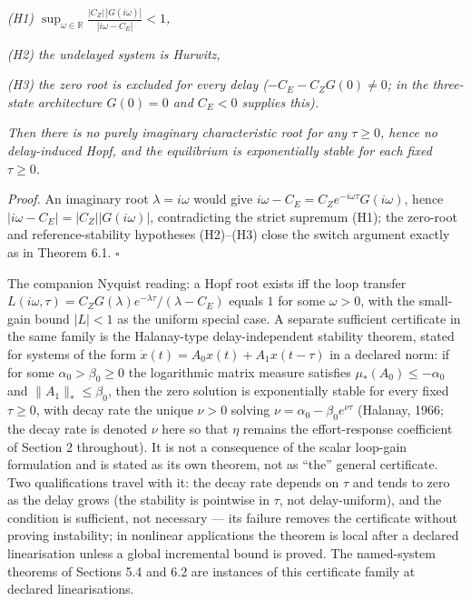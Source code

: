 \documentclass[11pt]{article}
\begin{document}
\emph{(H1)
\(\sup_{\omega \in \mathbb{R}} \frac{|C_Z|\,|G(i\omega)|}{|i\omega - C_E|} < 1\),}

\emph{(H2) the undelayed system is Hurwitz,}

\emph{(H3) the zero root is excluded for every delay
(\(-C_E - C_Z G(0) \neq 0\); in the three-state architecture
\(G(0) = 0\) and \(C_E < 0\) supplies this).}

\emph{Then there is no purely imaginary characteristic root for any
\(\tau \ge 0\), hence no delay-induced Hopf, and the equilibrium is
exponentially stable for each fixed \(\tau \ge 0\).}

\emph{Proof.} An imaginary root \(\lambda = i\omega\) would give
\(i\omega - C_E = C_Z e^{-i\omega\tau}G(i\omega)\), hence
\(|i\omega - C_E| = |C_Z||G(i\omega)|\), contradicting the strict
supremum (H1); the zero-root and reference-stability hypotheses
(H2)--(H3) close the switch argument exactly as in Theorem 6.1. \ensuremath{\square}

The companion Nyquist reading: a Hopf root exists iff the loop transfer
\(L(i\omega, \tau) = C_Z G(\lambda)e^{-\lambda\tau}/(\lambda - C_E)\)
equals \(1\) for some \(\omega > 0\), with the small-gain bound
\(|L| < 1\) as the uniform special case. A separate sufficient
certificate in the same family is the Halanay-type delay-independent
stability theorem, stated for systems of the form
\(\dot x(t) = A_0 x(t) + A_1 x(t - \tau)\) in a declared norm: if for
some \(\alpha_0 > \beta_0 \ge 0\) the logarithmic matrix measure
satisfies \(\mu_*(A_0) \le -\alpha_0\) and \(\|A_1\|_* \le \beta_0\),
then the zero solution is exponentially stable for every fixed
\(\tau \ge 0\), with decay rate the unique \(\nu > 0\) solving
\(\nu = \alpha_0 - \beta_0 e^{\nu\tau}\) (Halanay, 1966; the decay rate
is denoted \(\nu\) here so that \(\eta\) remains the effort-response
coefficient of Section 2 throughout). It is not a consequence of the
scalar loop-gain formulation and is stated as its own theorem, not as
``the'' general certificate. Two qualifications travel with it: the
decay rate depends on \(\tau\) and tends to zero as the delay grows (the
stability is pointwise in \(\tau\), not delay-uniform), and the
condition is sufficient, not necessary --- its failure removes the
certificate without proving instability; in nonlinear applications the
theorem is local after a declared linearisation unless a global
incremental bound is proved. The named-system theorems of Sections 5.4
and 6.2 are instances of this certificate family at declared
linearisations.
\end{document}
